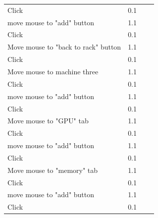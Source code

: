 \documentclass[11pt]{article}
\begin{document}
\begin{table}[]
{\begin{tabular}{lrlr}
					Click                                    & 0.1       &                                                 &     \\
					move mouse to "add" button               & 1.1       &                                                 &     \\
					Click                                    & 0.1       &                                                 &     \\
					Move mouse to "back to rack" button      & 1.1       &                                                 &     \\
					Click                                    & 0.1       &                                                 &     \\
					Move mouse to machine three              & 1.1       &                                                 &     \\
					Click                                    & 0.1       &                                                 &     \\
					move mouse to "add" button               & 1.1       &                                                 &     \\
					Click                                    & 0.1       &                                                 &     \\
					Move mouse to "GPU" tab                  & 1.1       &                                                 &     \\
					Click                                    & 0.1       &                                                 &     \\
					move mouse to "add" button               & 1.1       &                                                 &     \\
					Click                                    & 0.1       &                                                 &     \\
					Move mouse to "memory" tab               & 1.1       &                                                 &     \\
					Click                                    & 0.1       &                                                 &     \\
					move mouse to "add" button               & 1.1       &                                                 &     \\
					Click                                    & 0.1       &                                                 &     \\

\end{tabular}}
\end{table}
\end{document}
